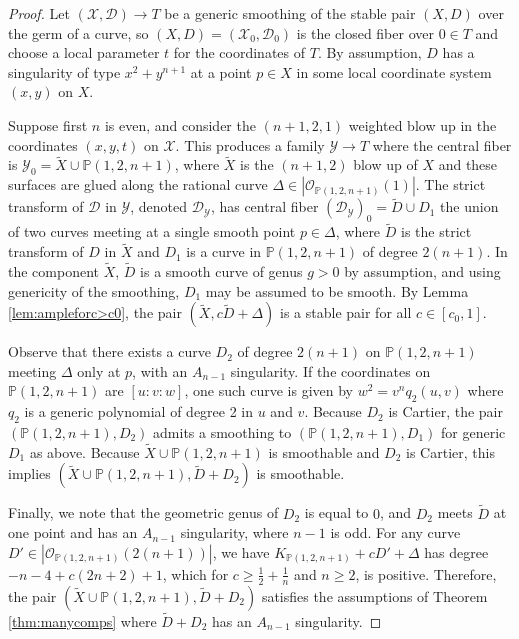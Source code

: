 \documentclass[11pt]{amsart}
\numberwithin{equation}{section}
\theoremstyle{definition}
\newcommand{\calY}{\mathcal{Y}}
\newcommand{\calX}{\mathcal{X}}
\newcommand{\bP}{\mathbb{P}}
\newcommand{\calD}{\mathcal{D}}
\newcommand{\calO}{\mathcal{O}}
\begin{document}
\begin{proof}
Let $(\calX, \calD) \to T$ be a generic smoothing of the stable pair $(X,D)$ over the germ of a curve, so $(X,D) = (\calX_0, \calD_0)$ is the closed fiber over $0 \in T$ and choose a local parameter $t$ for the coordinates of $T$.   By assumption, $D$ has a singularity of type $x^2 +y^{n+1}$ at a point $p \in X$ in some local coordinate system $(x,y)$ on $X$.  

Suppose first $n$ is even, and consider the $(n+1,2,1)$ weighted blow up in the coordinates $(x,y,t)$ on $\calX$.  This produces a family $\calY \to T$ where the central fiber is $\calY_0 = \tilde{X} \cup \bP(1,2,n+1)$, where $\tilde{X}$ is the $(n+1,2)$ blow up of $X$ and these surfaces are glued along the rational curve $\Delta \in |\calO_{\bP(1,2,n+1)}(1)|$.  The strict transform of $\calD$ in $\calY$, denoted $\calD_\calY$, has central fiber $(\calD_\calY)_0 = \tilde{D} \cup D_1$ the union of two curves meeting at a single smooth point $p \in \Delta$, where $\tilde{D}$ is the strict transform of $D$ in $\tilde{X}$ and $D_1$ is a curve in $\bP(1,2, n+1)$ of degree $2(n+1)$.  In the component $\tilde{X}$, $\tilde{D}$ is a smooth curve of genus $g > 0$ by assumption, and using genericity of the smoothing, $D_1$ may be assumed to be smooth.  By Lemma \ref{lem:ampleforc>c0}, the pair $(\tilde{X}, c\tilde{D} + \Delta)$ is a stable pair for all $c \in [c_0,1]$.

Observe that there exists a curve $D_2$ of degree $2(n+1)$ on $\bP(1,2,n+1)$ meeting $\Delta$ only at $p$, with an $A_{n-1}$ singularity.  If the coordinates on $\bP(1,2,n+1)$ are $[u:v:w]$, one such curve is given by $w^2 = v^{n}q_2(u,v)$ where $q_2$ is a generic polynomial of degree 2 in $u$ and $v$.  Because $D_2$ is Cartier, the pair $(\bP(1,2,n+1), D_2)$ admits a smoothing to $(\bP(1,2,n+1), D_1)$ for generic $D_1$ as above. Because $\tilde{X} \cup \bP(1,2,n+1)$ is smoothable and $D_2$ is Cartier, this implies $(\tilde{X}\cup \bP(1,2,n+1), \tilde{D} + D_2)$ is smoothable.

Finally, we note that the geometric genus of $D_2$ is equal to $0$, and $D_2$ meets $\tilde{D}$ at one point and has an $A_{n-1}$ singularity, where $n-1$ is odd. For any curve $D' \in |\calO_{\bP(1,2,n+1)}(2(n+1))|$, we have $K_{\bP(1,2,{n+1})} + cD' + \Delta$ has degree $-n-4 + c(2n+2) + 1$, which for $c \ge \frac{1}{2}+ \frac{1}{n}$ and $n \ge 2$, is positive.  Therefore, the pair $(\tilde{X}\cup \bP(1,2,n+1), \tilde{D} + D_2)$ satisfies the assumptions of Theorem \ref{thm:manycomps} where $\tilde{D} + D_2$ has an $A_{n-1}$ singularity. 


\end{proof}
\end{document}
